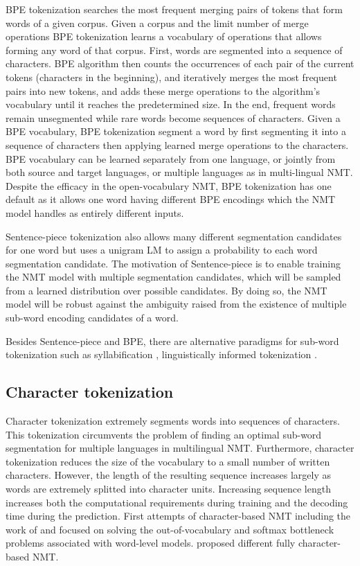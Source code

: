 BPE tokenization searches the most frequent merging pairs of tokens that form words of a given corpus. Given a corpus and the limit number of merge operations BPE tokenization learns a vocabulary of operations that allows forming any word of that corpus. First, words are segmented into a sequence of characters. BPE algorithm then counts the occurrences of each pair of the current tokens (characters in the beginning), and iteratively merges the most frequent pairs into new tokens, and adds these merge operations to the algorithm's vocabulary until it reaches the predetermined size. In the end, frequent words remain unsegmented while rare words become sequences of characters. Given a BPE vocabulary, BPE tokenization segment a word by first segmenting it into a sequence of characters then applying learned merge operations to the characters. BPE vocabulary can be learned separately from one language, or jointly from both source and target languages, or multiple languages as in multi-lingual NMT. Despite the efficacy in the open-vocabulary NMT, BPE tokenization has one default as it allows one word having different BPE encodings \citep{Taku18subword} which the NMT model handles as entirely different inputs.

Sentence-piece tokenization also allows many different segmentation candidates for one word but uses a unigram LM to assign a probability to each word segmentation candidate. The motivation of Sentence-piece is to enable training the NMT model with multiple segmentation candidates, which will be sampled from a learned distribution over possible candidates. By doing so, the NMT model will be robust against the ambiguity raised from the existence of multiple sub-word encoding candidates of a word. 

Besides Sentence-piece and BPE, there are alternative paradigms for sub-word tokenization such as syllabification \citep{Assylbekov17syllable}, linguistically informed tokenization \citep{Ataman17linguistically, Huck17target, Machcek18morphological}.
\subsection{Character tokenization}
Character tokenization extremely segments words into sequences of characters. This tokenization circumvents the problem of finding an optimal sub-word segmentation for multiple languages in multilingual NMT. Furthermore, character tokenization reduces the size of the vocabulary to a small number of written characters. However, the length of the resulting sequence increases largely as words are extremely splitted into character units. Increasing sequence length increases both the computational requirements during training and the decoding time during the prediction. First attempts of character-based NMT including the work of \cite{Wang15character} and \cite{Luong16achieving} focused on solving the out-of-vocabulary and softmax bottleneck problems associated with word-level models. \cite{Costa16character, Lee17fully, Chung16character, costa17byte} proposed different fully character-based NMT.
